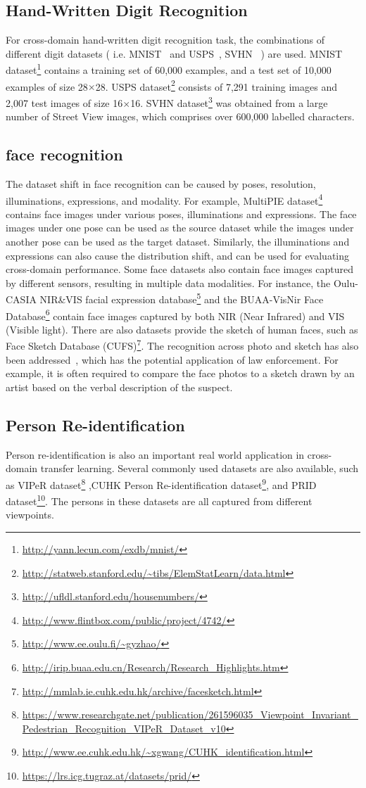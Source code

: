 \documentclass[prodmode]{acmsmall}  %
\begin{document}
\subsection{Hand-Written Digit Recognition}
For cross-domain hand-written digit recognition task, the combinations of different digit datasets ( i.e. MNIST~\cite{LeCun1998} and USPS~\cite{Hull1994}, SVHN~\cite{Netzer2011} ) are used. MNIST dataset\footnote{\url{http://yann.lecun.com/exdb/mnist/}} contains a training set of 60,000 examples, and a test set of 10,000 examples of size 28$\times$28. USPS dataset\footnote{\url{http://statweb.stanford.edu/~tibs/ElemStatLearn/data.html}} consists of 7,291 training images and 2,007 test images of size 16$\times$16. SVHN dataset\footnote{\url{http://ufldl.stanford.edu/housenumbers/}} was obtained from a large number of Street View images, which comprises over 600,000 labelled characters.

\subsection{face recognition}
The dataset shift in face recognition can be caused by poses, resolution, illuminations, expressions, and modality. For example, MultiPIE dataset\footnote{\url{http://www.flintbox.com/public/project/4742/}}~\cite{Gross2010} contains face images under various poses, illuminations and expressions. The face images under one pose can be used as the source dataset while the images under another pose can be used as the target dataset. Similarly, the illuminations and expressions can also cause the distribution shift, and can be used for evaluating cross-domain performance. Some face datasets also contain face images captured by different sensors, resulting in multiple data modalities. For instance, the Oulu-CASIA NIR\&VIS facial expression database\footnote{\url{http://www.ee.oulu.fi/~gyzhao/}} and the BUAA-VisNir Face Database\footnote{\url{http://irip.buaa.edu.cn/Research/Research_Highlights.htm}} contain face images captured by both NIR (Near Infrared) and VIS (Visible light). There are also datasets provide the sketch of human faces, such as Face Sketch Database (CUFS)\footnote{\url{http://mmlab.ie.cuhk.edu.hk/archive/facesketch.html}}. The recognition across photo and sketch has also been addressed~\cite{Wang2012b}, which has the potential application of law enforcement. For example, it is often required to compare the face photos to a sketch drawn by an artist based on the verbal description of the suspect.
\subsection{Person Re-identification}
Person re-identification is also an important real world application in cross-domain transfer learning. Several commonly used datasets are also available, such as VIPeR dataset\footnote{\url{https://www.researchgate.net/publication/261596035_Viewpoint_Invariant_Pedestrian_Recognition_VIPeR_Dataset_v10}} ,CUHK Person Re-identification dataset\footnote{\url{http://www.ee.cuhk.edu.hk/~xgwang/CUHK_identification.html}}, and PRID dataset\footnote{\url{https://lrs.icg.tugraz.at/datasets/prid/}}. The persons in these datasets are all captured from different viewpoints.
\end{document}
